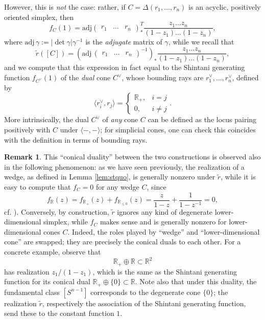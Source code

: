 \documentclass[10pt]{amsart}
\theoremstyle{definition}
\newtheorem{rem}[thm]{Remark}
\newcommand{\R}{\mathbb{R}}
\numberwithin{equation}{section}
\begin{document}
    However, this is \emph{not} the case: rather, if $C=\Delta(r_1,\ldots, r_n)$ is an acyclic, positively oriented simplex, then 
    \[
        f_C(1) = \mathrm{adj} \begin{pmatrix} r_1 & \ldots & r_n \end{pmatrix}^T_* \frac{z_1\ldots z_n}{(1-z_1)\ldots (1-z_n)},
    \]    
    where $\mathrm{adj}\,\gamma:= |\det \gamma| \gamma^{-1}$ is the \emph{adjugate} matrix of $\gamma$, while we recall that
    \[
        \widetilde{r}([C]) = (\mathrm{adj}\, \begin{pmatrix} r_1 & \ldots & r_n \end{pmatrix}^{-1})_* \frac{z_1\ldots z_n}{(1-z_1)\ldots (1-z_n)},
    \]
    and we compute that this expression in fact equal to the Shintani generating function $f_{C^\vee}(1)$ of the \emph{dual} cone $C^\vee$, whose bounding rays are $r_1^\vee,\ldots, r_n^\vee$, defined by
    \[
    \langle r_i^\vee,r_j\rangle = \begin{cases}
        \R_+, &i=j\\
        0, &i\ne j
        \end{cases}.
    \]
    More intrinsically, the dual $C^\vee$ of \emph{any} cone $C$ can be defined as the locus pairing positively with $C$ under $\langle-,-\rangle$; for simplicial cones, one can check this coincides with the definition in terms of bounding rays.

    \begin{rem}\label{rem:conicalduality}
    This ``conical duality'' between the two constructions is observed also in the following phenomenon: as we have seen previously, the realization of a wedge, as defined in Lemma \ref{lem:stquo}, is generally nonzero under $\widetilde{r}$, while it is easy to compute that $f_C=0$ for any wedge $C$, since 
    \[
    f_{\R}(z) = f_{\R_+}(z)+f_{\R_{\le 0}}(z) = \frac{z}{1-z} + \frac{1}{1-z^{-1}} =0 ,
    \]
    cf. \cite{SH}). Conversely, by construction, $\widetilde{r}$ ignores any kind of degenerate lower-dimensional simplex, while $f_C$ makes sense and is generally nonzero for lower-dimensional cones $C$. Indeed, the roles played by ``wedge'' and ``lower-dimensional cone'' are swapped; they are precisely the conical duals to each other. For a concrete example, observe that 
    \[
    \R_+\oplus \R\subset \R^2
    \]
    has realization $z_1/(1-z_1)$, which is the same as the Shintani generating function for its conical dual $\R_+\oplus \{0\} \subset \R$. Note also that under this duality, the fundamental class $[S^{n-1}]$ corresponds to the degenerate cone $\{0\}$; the realization $\widetilde{r}$, respectively the association of the Shintani generating function, send these to the constant function $1$. 
    \end{rem}
    
\end{document}
